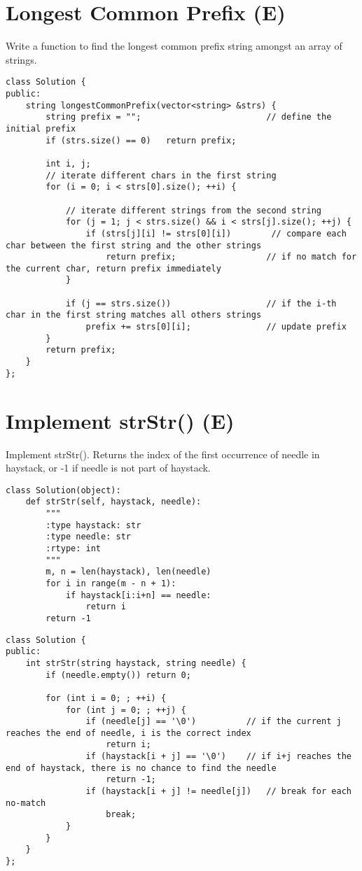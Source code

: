 \section{Longest Common Prefix (E)}
Write a function to find the longest common prefix string amongst an array of strings. \\

\begin{lstlisting}
class Solution {
public:
    string longestCommonPrefix(vector<string> &strs) {
        string prefix = "";                         // define the initial prefix
        if (strs.size() == 0)   return prefix;
        
        int i, j;
        // iterate different chars in the first string
        for (i = 0; i < strs[0].size(); ++i) { 
            
            // iterate different strings from the second string
            for (j = 1; j < strs.size() && i < strs[j].size(); ++j) {     
                if (strs[j][i] != strs[0][i])        // compare each char between the first string and the other strings
                    return prefix;                  // if no match for the current char, return prefix immediately
            }
            
            if (j == strs.size())                   // if the i-th char in the first string matches all others strings
                prefix += strs[0][i];               // update prefix
        }
        return prefix;
    }
};
\end{lstlisting}


\section{Implement strStr() (E)}
Implement strStr(). Returns the index of the first occurrence of needle in haystack, or -1 if needle is not part of haystack. \\

\begin{lstlisting}
class Solution(object):
    def strStr(self, haystack, needle):
        """
        :type haystack: str
        :type needle: str
        :rtype: int
        """
        m, n = len(haystack), len(needle)
        for i in range(m - n + 1):
            if haystack[i:i+n] == needle:
                return i
        return -1
\end{lstlisting}

\begin{lstlisting}
class Solution {
public:
    int strStr(string haystack, string needle) {
        if (needle.empty()) return 0;

        for (int i = 0; ; ++i) {
            for (int j = 0; ; ++j) {
                if (needle[j] == '\0')          // if the current j reaches the end of needle, i is the correct index
                    return i;
                if (haystack[i + j] == '\0')    // if i+j reaches the end of haystack, there is no chance to find the needle
                    return -1;
                if (haystack[i + j] != needle[j])   // break for each no-match
                    break;
            }
        }
    }
};
\end{lstlisting}


